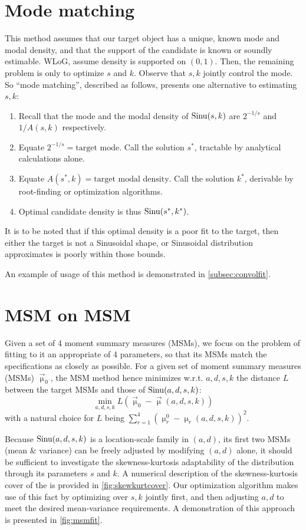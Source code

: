 \section{Mode matching} \label{sec:modematch}
This method assumes that our target object has a unique, known mode and modal density, and that the support of the candidate \sindist{} is known or soundly estimable. WLoG, assume density is supported on $(0,1)$. Then, the remaining problem is only to optimize $s$ and $k$. Observe that $s,k$ jointly control the mode. So ``mode matching'', described as follows, presents one alternative to estimating $s,k$:
\begin{enumerate}
	\item Recall that the mode and the modal density of $\operatorname*{Sinu}(s,k)$ are $2^{-1/s}$ and $1/A(s,k)$ respectively.
 	\item Equate $2^{-1/s} = \text{target mode}$. Call the solution $s^*$, tractable by analytical calculations alone.
	\item Equate $A(s^*, k) = \text{target modal density}$. Call the solution $k^*$, derivable by root-finding or optimization algorithms.
	\item Optimal candidate density is thus $\operatorname*{Sinu}(s^*, k^*)$.
\end{enumerate}
It is to be noted that if this optimal density is a poor fit to the target, then either the target is not a Sinusoidal shape, or Sinusoidal distribution approximates is poorly within those bounds.

An example of usage of this method is demonstrated in \autoref{subsec:convolfit}.

\section{MSM on MSM}\label{sec:msmfit}
Given a set of 4 moment summary measures (MSMs), we focus on the problem of fitting to it an appropriate \sindist{} of 4 parameters, so that its MSMs match the specifications as closely as possible. For a given set of moment summary measures (MSMs) $\vec{\upmu}_0$, the MSM method hence minimizes w.r.t. $a,d,s,k$ the distance $L$ between the target MSMs and those of $\operatorname*{Sinu}(a,d,s,k)$:
\[\min_{a,d,s,k} L(\vec{\upmu}_0 - \vec{\upmu}(a,d,s,k))\]
with a natural choice for $L$ being $\sum_{r=1}^4 (\upmu^0_r - \upmu_r(a,d,s,k))^2$.

Because $\operatorname*{Sinu}(a,d,s,k)$ is a location-scale family in $(a,d)$, its first two MSMs (mean \& variance) can be freely adjusted by modifying $(a,d)$ alone, it should be sufficient to investigate the skewness-kurtosis adaptability of the distribution through its parameters $s$ and $k$. A numerical description of the skewness-kurtosis cover of the \sindist is provided in \autoref{fig:skewkurtcover}. Our optimization algorithm makes use of this fact by optimizing over $s, k$ jointly first, and then adjusting $a,d$ to meet the desired mean-variance requirements. A demonstration of this approach is presented in \autoref{fig:msmfit}.


